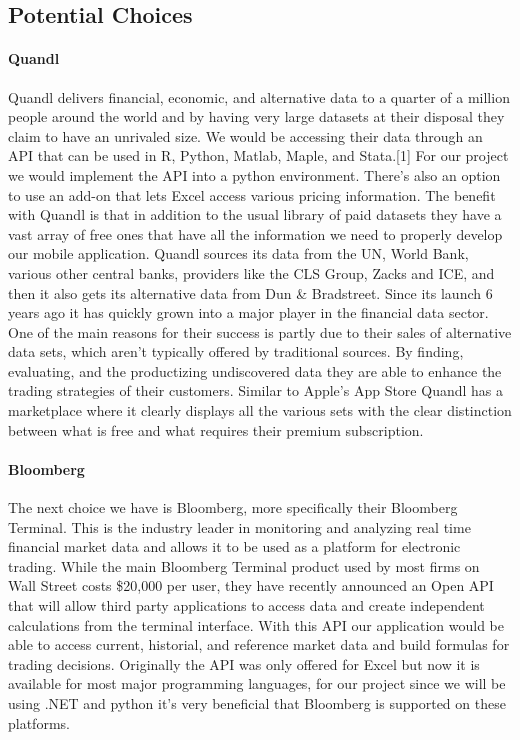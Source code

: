 \documentclass[onecolumn, draftclsnofoot,10pt, compsoc]{IEEEtran}
\begin{document}
\subsection{Potential Choices}

\paragraph{Quandl}
Quandl delivers financial, economic, and alternative data to a quarter of a million people around the world and by having very large datasets at their disposal they claim to have an unrivaled size. We would be accessing their data through an API that can be used in R, Python, Matlab, Maple, and Stata.[1] For our project we would implement the API into a python environment. There’s also an option to use an add-on that lets Excel access various pricing information. The benefit with Quandl is that in addition to the usual library of paid datasets they have a vast array of free ones that have all the information we need to properly develop our mobile application. Quandl sources its data from the UN, World Bank, various other central banks, providers like the CLS Group, Zacks and ICE, and then it also gets its alternative data from Dun \& Bradstreet. Since its launch 6 years ago it has quickly grown into a major player in the financial data sector. One of the main reasons for their success is partly due to their sales of alternative data sets, which aren’t typically offered by traditional sources. By finding, evaluating, and the productizing undiscovered data they are able to enhance the trading strategies of their customers. Similar to Apple’s App Store Quandl has a marketplace where it clearly displays all the various sets with the clear distinction between what is free and what requires their premium subscription. 

\paragraph{Bloomberg}
The next choice we have is Bloomberg, more specifically their Bloomberg Terminal. This is the industry leader in monitoring and analyzing real time financial market data and allows it to be used as a platform for electronic trading. While the main Bloomberg Terminal product used by most firms on Wall Street costs \$20,000 per user, they have recently announced an Open API that will allow third party applications to access data and create independent calculations from the terminal interface. With this API our application would be able to access current, historial, and reference market data and build formulas for trading decisions. Originally the API was only offered for Excel but now it is available for most major programming languages, for our project since we will be using .NET and python it’s very beneficial that Bloomberg is supported on these platforms. 
\end{document}
